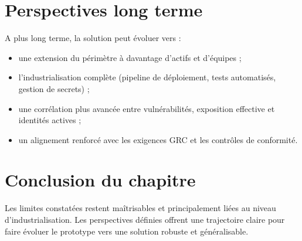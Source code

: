 \section{Perspectives long terme}
A plus long terme, la solution peut évoluer vers :
\begin{itemize}
	\item une extension du périmètre à davantage d'actifs et d'équipes ;
	\item l'industrialisation complète (pipeline de déploiement, tests automatisés, gestion de secrets) ;
	\item une corrélation plus avancée entre vulnérabilités, exposition effective et identités actives ;
	\item un alignement renforcé avec les exigences GRC et les contrôles de conformité.
\end{itemize}

\section{Conclusion du chapitre}
Les limites constatées restent maîtrisables et principalement liées au niveau d'industrialisation. Les perspectives définies offrent une trajectoire claire pour faire évoluer le prototype vers une solution robuste et généralisable.
